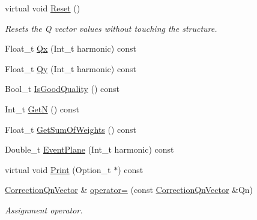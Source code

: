 \begin{DoxyCompactItemize}
virtual void \mbox{\hyperlink{classQn_1_1CorrectionQnVector_ab157bf86ea39a70bba7f3fd1534d0166}{Reset}} ()
\begin{DoxyCompactList}\small\item\em Resets the Q vector values without touching the structure. \end{DoxyCompactList}\item 
Float\+\_\+t \mbox{\hyperlink{classQn_1_1CorrectionQnVector_a7a72044374f9040ebfdc364e574f0cca}{Qx}} (Int\+\_\+t harmonic) const
\item 
Float\+\_\+t \mbox{\hyperlink{classQn_1_1CorrectionQnVector_adf6c66295489c2638e9f692a77f6ca9b}{Qy}} (Int\+\_\+t harmonic) const
\item 
Bool\+\_\+t \mbox{\hyperlink{classQn_1_1CorrectionQnVector_a314e710f1e4f6d09ab19907c5ecd48dc}{Is\+Good\+Quality}} () const
\item 
Int\+\_\+t \mbox{\hyperlink{classQn_1_1CorrectionQnVector_ab182d3ac68a795f5732daa83ae2f7417}{GetN}} () const
\item 
Float\+\_\+t \mbox{\hyperlink{classQn_1_1CorrectionQnVector_a77ec3056318b215938cac926cd9cb3c2}{Get\+Sum\+Of\+Weights}} () const
\item 
Double\+\_\+t \mbox{\hyperlink{classQn_1_1CorrectionQnVector_afa869b89c2b19a6f473572e45e6c33ec}{Event\+Plane}} (Int\+\_\+t harmonic) const
\item 
virtual void \mbox{\hyperlink{classQn_1_1CorrectionQnVector_a859e8ffe20c7a607f67bb95f8c85b9e9}{Print}} (Option\+\_\+t $\ast$) const
\item 
\mbox{\label{classQn_1_1CorrectionQnVector_a70ce863e91181bcd6a259453aebb12d9}} 
\mbox{\hyperlink{classQn_1_1CorrectionQnVector}{Correction\+Qn\+Vector}} \& \mbox{\hyperlink{classQn_1_1CorrectionQnVector_a70ce863e91181bcd6a259453aebb12d9}{operator=}} (const \mbox{\hyperlink{classQn_1_1CorrectionQnVector}{Correction\+Qn\+Vector}} \&Qn)
\begin{DoxyCompactList}\small\item\em Assignment operator. \end{DoxyCompactList}\end{DoxyCompactItemize}
